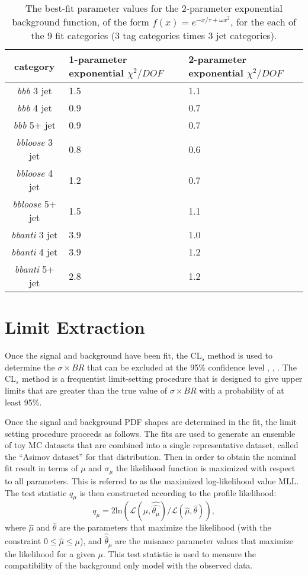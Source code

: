 \begin{table}
    \center
    \caption{The best-fit parameter values for the 2-parameter exponential background
    function, of the form $f(x)=e^{-x/\tau+\omega x^2}$, for the each of the 9 
    fit categories (3 tag categories times 3 jet categories).  
    \label{tab:bkgFit}}
    \begin{tabular}{ c p{3cm} p{3cm} } \hline \hline
        category & 1-parameter exponential $\chi^2/DOF$ & 2-parameter exponential $\chi^2/DOF$ \\ \hline
        \textit{bbb} 3 jet & 1.5 & 1.1 \\
        \textit{bbb} 4 jet & 0.9  & 0.7 \\
        \textit{bbb} 5+ jet & 0.9  & 0.7 \\
        \textit{bbloose} 3 jet & 0.8 & 0.6 \\
        \textit{bbloose} 4 jet & 1.2 & 0.7 \\
        \textit{bbloose} 5+ jet & 1.5 & 1.1 \\
        \textit{bbanti} 3 jet & 3.9 & 1.0 \\
        \textit{bbanti} 4 jet & 3.9 & 1.2 \\
        \textit{bbanti} 5+ jet & 2.8 & 1.2 \\
        \hline
    \end{tabular}
\end{table} 






\section{Limit Extraction}
Once the signal and background have been fit, the CL$_s$ method is used to 
determine the $\sigma\times BR$ that can be excluded at the 95\% confidence
level \cite{CLS1}, \cite{CLS2}, \cite{CLS3}.  The CL$_s$ method is a
frequentist limit-setting procedure that is designed to give upper limits that
are greater than the true value of $\sigma\times BR$ with a probability of at
least 95\%.

Once the signal and background PDF shapes are determined in the fit,
the limit setting procedure proceeds as follows.  The fits are used to generate
an ensemble of toy MC datasets
that are combined into a single representative dataset, called the ``Asimov
dataset'' for that distribution.  Then 
in order to obtain the nominal fit result in terms of $\mu$ and $\sigma_{\mu}$
the likelihood function is maximized with respect to all parameters.
This is referred to as the maximized log-likelihood value MLL.
The test statistic $q_\mu$ is then constructed according to
the profile likelihood:
\begin{equation}
q_\mu = 2 \mathrm{ln} (\mathcal{L} (\mu,
\hat{\hat{\theta_\mu}})/\mathcal{L} (\hat{\mu}, \hat{\theta})), 
\end{equation}
where
$\hat{\mu}$ and $\hat{\theta}$ are the parameters that maximize the
likelihood (with the constraint $0 \leq \hat{\mu} \leq \mu$), and
$\hat{\hat{\theta}}_\mu$ are the nuisance parameter values that maximize the
likelihood for a given $\mu$. This test statistic is used to measure
the compatibility of the background only model with the observed
data. 

